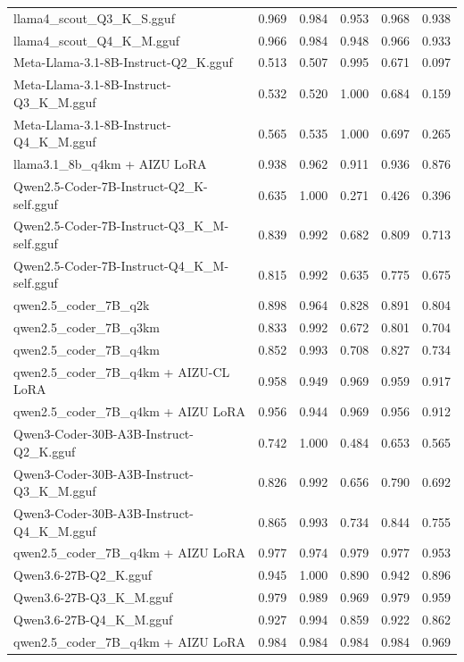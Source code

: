 \begin{table}[htbp]
{\begin{tabular}{lrrrrr}
    llama4\_scout\_Q3\_K\_S.gguf & 0.969 & 0.984 & 0.953 & 0.968 & 0.938 \\
    llama4\_scout\_Q4\_K\_M.gguf & 0.966 & 0.984 & 0.948 & 0.966 & 0.933 \\
    Meta-Llama-3.1-8B-Instruct-Q2\_K.gguf & 0.513 & 0.507 & 0.995 & 0.671 & 0.097 \\
    Meta-Llama-3.1-8B-Instruct-Q3\_K\_M.gguf & 0.532 & 0.520 & 1.000 & 0.684 & 0.159 \\
    Meta-Llama-3.1-8B-Instruct-Q4\_K\_M.gguf & 0.565 & 0.535 & 1.000 & 0.697 & 0.265 \\
    llama3.1\_8b\_q4km + AIZU LoRA & 0.938 & 0.962 & 0.911 & 0.936 & 0.876 \\
    Qwen2.5-Coder-7B-Instruct-Q2\_K-self.gguf & 0.635 & 1.000 & 0.271 & 0.426 & 0.396 \\
    Qwen2.5-Coder-7B-Instruct-Q3\_K\_M-self.gguf & 0.839 & 0.992 & 0.682 & 0.809 & 0.713 \\
    Qwen2.5-Coder-7B-Instruct-Q4\_K\_M-self.gguf & 0.815 & 0.992 & 0.635 & 0.775 & 0.675 \\
    qwen2.5\_coder\_7B\_q2k & 0.898 & 0.964 & 0.828 & 0.891 & 0.804 \\
    qwen2.5\_coder\_7B\_q3km & 0.833 & 0.992 & 0.672 & 0.801 & 0.704 \\
    qwen2.5\_coder\_7B\_q4km & 0.852 & 0.993 & 0.708 & 0.827 & 0.734 \\
    qwen2.5\_coder\_7B\_q4km + AIZU-CL LoRA & 0.958 & 0.949 & 0.969 & 0.959 & 0.917 \\
    qwen2.5\_coder\_7B\_q4km + AIZU LoRA & 0.956 & 0.944 & 0.969 & 0.956 & 0.912 \\
    Qwen3-Coder-30B-A3B-Instruct-Q2\_K.gguf & 0.742 & 1.000 & 0.484 & 0.653 & 0.565 \\
    Qwen3-Coder-30B-A3B-Instruct-Q3\_K\_M.gguf & 0.826 & 0.992 & 0.656 & 0.790 & 0.692 \\
    Qwen3-Coder-30B-A3B-Instruct-Q4\_K\_M.gguf & 0.865 & 0.993 & 0.734 & 0.844 & 0.755 \\
    qwen2.5\_coder\_7B\_q4km + AIZU LoRA & 0.977 & 0.974 & 0.979 & 0.977 & \cellcolor{green!20}0.953 \\
    Qwen3.6-27B-Q2\_K.gguf & 0.945 & 1.000 & 0.890 & 0.942 & 0.896 \\
    Qwen3.6-27B-Q3\_K\_M.gguf & 0.979 & 0.989 & 0.969 & 0.979 & \cellcolor{green!40}0.959 \\
    Qwen3.6-27B-Q4\_K\_M.gguf & 0.927 & 0.994 & 0.859 & 0.922 & 0.862 \\
    qwen2.5\_coder\_7B\_q4km + AIZU LoRA & 0.984 & 0.984 & 0.984 & 0.984 & \cellcolor{green!50}0.969 \\

\end{tabular}}
\end{table}
